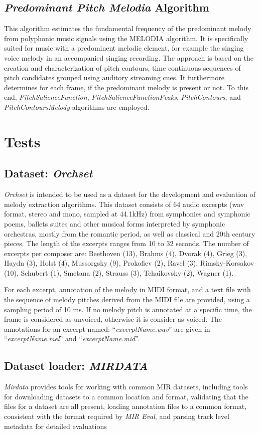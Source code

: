 \documentclass{article}
\begin{document}
\subsection{\textit{Predominant Pitch Melodia} Algorithm}
This algorithm estimates the fundamental frequency of the predominant melody from polyphonic music signals using the MELODIA algorithm. It is specifically suited for music with a predominent melodic element, for example the singing voice melody in an accompanied singing recording. The approach is based on the creation and characterization of pitch contours, time continuous sequences of pitch candidates grouped using auditory streaming cues. It furthermore determines for each frame, if the predominant melody is present or not. To this end, \textit{PitchSalienceFunction}, \textit{PitchSalienceFunctionPeaks}, \textit{PitchContours}, and \textit{PitchContoursMelody} algorithms are employed.

\section{Tests}
\subsection{Dataset: \textit{Orchset}}
\textit{Orchset} is intended to be used as a dataset for the development and evaluation of melody extraction algorithms. This dataset consists of 64 audio excerpts (wav format, stereo and mono, sampled at 44.1kHz) from symphonies and symphonic poems, ballets suites and other musical forms interpreted by symphonic orchestras, mostly from the romantic period, as well as classical and 20th century pieces. The length of the excerpts ranges from 10 to 32 seconds. The number of excerpts per composer are: Beethoven (13), Brahms (4), Dvorak (4), Grieg (3), Haydn (3), Holst (4), Mussorgsky (9), Prokofiev (2), Ravel (3), Rimsky-Korsakov (10), Schubert (1), Smetana (2), Strauss (3), Tchaikovsky (2), Wagner (1).

For each excerpt, annotation of the melody in MIDI format, and a text file with the sequence of melody pitches derived from the MIDI file are provided, using a sampling period of 10 ms. If no melody pitch is annotated at a specific time, the frame is considered as unvoiced, otherwise it is consider as voiced. The annotations for an excerpt named: “\textit{excerptName.wav}” are given in “\textit{excerptName.mel}” and “\textit{excerptName.mid}”.

\subsection{Dataset loader: \textit{MIRDATA}}
\textit{Mirdata} provides tools for working with common MIR datasets, including tools for downloading datasets to a common location and format, validating that the files for a dataset are all present, loading annotation files to a common format, consistent with the format required by \textit{MIR Eval}, and parsing track level metadata for detailed evaluations
\end{document}

